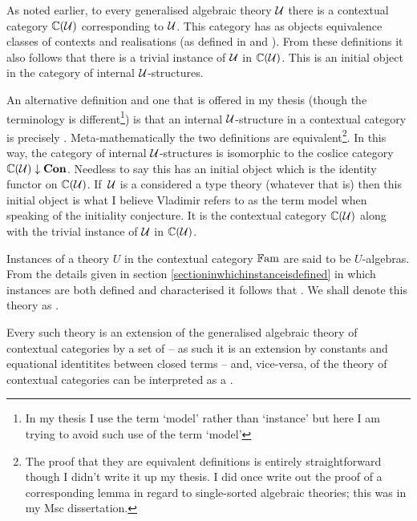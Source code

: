 \note 
As  noted earlier, to every generalised algebraic theory $\gat[U]$ there  is a contextual category $\CofU$ corresponding to $\gat[U]$. This category has as objects equivalence classes of contexts and realisations (as defined 
in \cite{Cartmell78} and  \cite{Cartmell86}). 
From these definitions it also follows that there is a trivial instance
of $\gat[U]$ in  $\CofU$. This is an initial object in
the category of internal $\gat[U]$-structures.

\note 
An alternative definition and one that is offered  in my thesis 
(though the terminology is different\footnote{In my thesis I use the term `model' rather than `instance'  but here I am trying to avoid such use of the term `model'}) is that an internal $\gat[U]$-structure in a contextual category \catcw is precisely 
 . 
Meta-mathematically the two definitions are equivalent\footnote{The proof that they are equivalent 
definitions is entirely straightforward though I didn't write it up my thesis. I did once write out the proof of a  corresponding lemma in regard to single-sorted algebraic theories; this was in my Msc dissertation.}.
\note
In this way, the category of internal $\gat[U]$-structures  is isomorphic to the coslice category
$\CofU \downarrow \catCon$. Needless to say this has an initial object which is the identity functor on  $\CofU$.
If\ $\gat[U]$ is a considered a type theory (whatever that is) then this initial object is what I believe Vladimir refers
to as the term model when speaking of the initiality conjecture. It is the contextual category
$\CofU$ along with the trivial instance of $\gat[U]$ in $\CofU$.

\note 
Instances of a theory $U$ in the contextual category $\Fam$ are said to be $U$-algebras. 
\newcommand{\hatU}{\rule{0pt}{12pt}\hat {\gat[U]}}
\note 
From the details given in
section \ref{sectioninwhichinstanceisdefined} 
in which instances are both defined and characterised 
it follows that 
. We shall denote this theory as \highlight{$\hatU$}.

Every such theory \highlight{$\hatU$} is an extension of the generalised algebraic theory of contextual categories
by a set of  -- as such it is an extension
by constants and equational identitites between closed terms -- and, vice-versa,  of
the theory of contextual categories can be interpreted as a .  

